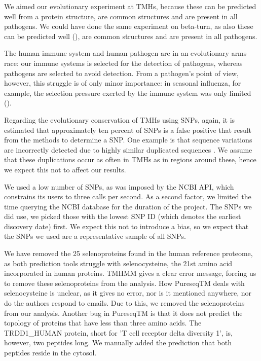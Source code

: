 We aimed our evolutionary experiment at TMHs, because these can
be predicted well from a protein structure,
are common structures and are present in all pathogens. 
We could have done the same experiment on beta-turn,
as also these can be predicted well (\cite{petersen2010netturnp}),
are common structures and are present in all pathogens.

The human immune system and human pathogen are in an evolutionary
arms race: our immune systems is selected for the detection
of pathogens, whereas pathogens are selected to avoid detection.
From a pathogen's point of view, however, this struggle 
is of only minor importance:
in seasonal influenza, for example, the selection pressure
exerted by the immune system was only limited (\cite{han2019individual}).

Regarding the evolutionary conservation of TMHs using SNPs,
again, it is estimated that approximately ten percent
of SNPs is a false positive that result from the methods to determine
a SNP. One example is that sequence variations are incorrectly
detected due to highly similar duplicated sequences \cite{musumeci2010single}.
We assume that these duplications occur as often in TMHs as in
regions around these, hence we expect this not to affect our results.

We used a low number of SNPs, as was imposed by the
NCBI API, which constrains its users to three calls per second.
As a second factor, we limited the time querying the NCBI database
for the duration of the project.
The SNPs we did use, we picked those
with the lowest SNP ID (which denotes the earliest discovery date) first.
We expect this not to introduce a bias, so we expect that
the SNPs we used are a representative sample of all SNPs.

We have removed the 25 selenoproteins found in the human
reference proteome, as both prediction tools struggle with 
selenocysteine, the 21st amino acid incorporated in human proteins.
TMHMM gives a clear error message, forcing us to remove
these selenoproteins from the analysis.
How PureseqTM deals with selenocysteine is unclear,
as it gives no error, nor is it mentioned anywhere,
nor do the authors respond to emails. Due to this, we removed the
selenoproteins from our analysis.
Another bug in PureseqTM is that it does not predict the topology
of proteins that have less than three amino acids. 
The TRDD1_HUMAN protein, short for 'T cell receptor delta diversity 1',
is, however, two peptides long. We manually added the prediction
that both peptides reside in the cytosol.

